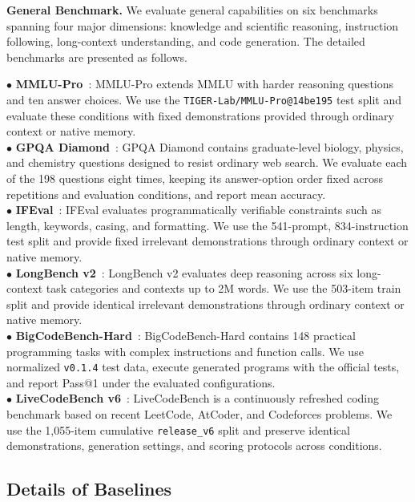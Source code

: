 \textbf{General Benchmark.}
We evaluate general capabilities on six benchmarks spanning four major dimensions: knowledge and scientific reasoning, instruction following, long-context understanding, and code generation.
The detailed benchmarks are presented as follows.

$\bullet$ \textbf{MMLU-Pro}~\cite{wang2024mmlu}: MMLU-Pro extends MMLU with harder reasoning questions and ten answer choices. We use the \texttt{TIGER-Lab/MMLU-Pro@14be195} test split and evaluate these conditions with fixed demonstrations provided through ordinary context or native memory. \\
$\bullet$ \textbf{GPQA Diamond}~\cite{rein2023gpqa}: GPQA Diamond contains graduate-level biology, physics, and chemistry questions designed to resist ordinary web search.
We evaluate each of the 198 questions eight times, keeping its answer-option order fixed across repetitions and evaluation conditions, and report mean accuracy. \\
$\bullet$ \textbf{IFEval}~\cite{zhou2023instruction}: IFEval evaluates programmatically verifiable constraints such as length, keywords, casing, and formatting. We use the 541-prompt, 834-instruction test split and provide fixed irrelevant demonstrations through ordinary context or native memory. \\
$\bullet$ \textbf{LongBench v2}~\cite{bai2025longbench}: LongBench v2 evaluates deep reasoning across six long-context task categories and contexts up to 2M words.
We use the 503-item train split and provide identical irrelevant demonstrations through ordinary context or native memory. \\
$\bullet$ \textbf{BigCodeBench-Hard}~\cite{zhuo2025bigcodebench}: BigCodeBench-Hard contains 148 practical programming tasks with complex instructions and function calls.
We use normalized \texttt{v0.1.4} test data, execute generated programs with the official tests, and report Pass@1 under the evaluated configurations.\\
$\bullet$ \textbf{LiveCodeBench v6}~\cite{jain2025livecodebench}: LiveCodeBench is a continuously refreshed coding benchmark based on recent LeetCode, AtCoder, and Codeforces problems.
We use the 1,055-item cumulative \texttt{release\_v6} split and preserve identical demonstrations, generation settings, and scoring protocols across conditions.

\subsection{Details of Baselines}
\label{appendix:baseline_details}

